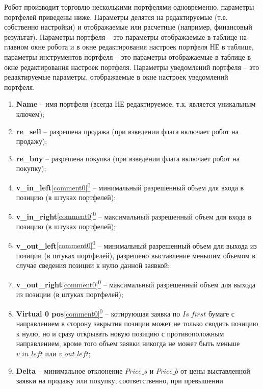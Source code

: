 Робот производит торговлю несколькими портфелями одновременно, параметры портфелей приведены ниже. Параметры делятся на редактируемые (т.е. собственно настройки) и
отображаемые или расчетные (например, финансовый результат). Параметры портфеля -- это параметры отображаемые в таблице на главном окне робота и в окне редактирования настроек
портфеля НЕ в таблице, параметры инструментов портфеля -- это параметры отображаемые в таблице в окне редактирования настроек портфеля. Параметры уведомлений портфеля -- это
редактируемые параметры, отображаемые в окне настроек уведомлений портфеля.


\begin{enumerate}
	\item \textbf{Name} -- имя портфеля (всегда НЕ редактируемое, т.к. является уникальным ключем);
	\item \textbf{re\_sell} -- разрешена продажа (при взведении флага включает робот на продажу);
	\item \textbf{re\_buy} -- разрешена покупка (при взведении флага включает робот на покупку);
	\item \textbf{v\_in\_left}\hyperref[comment0]{\ref{comment0}\textsuperscript{0}} -- минимальный разрешенный объем для входа в позицию (в штуках портфелей);
	\item \textbf{v\_in\_right}\hyperref[comment0]{\ref{comment0}\textsuperscript{0}} -- максимальный разрешенный объем для входа в позицию (в штуках портфелей);
	\item \textbf{v\_out\_left}\hyperref[comment0]{\ref{comment0}\textsuperscript{0}} -- минимальный разрешенный объем для выхода из позиции (в штуках портфелей), разрешено выставление меньшим объемом в случае сведения
		позиции к нулю данной заявкой;
	\item \textbf{v\_out\_right}\hyperref[comment0]{\ref{comment0}\textsuperscript{0}} -- максимальный разрешенный объем для выхода из позиции (в штуках портфелей);
	\item \textbf{Virtual 0 pos}\hyperref[comment0]{\ref{comment0}\textsuperscript{0}} -- котирующая заявка по $Is \; first$ бумаге с направлением в сторону закрытия позиции может не только сводить позицию к нулю,
		но и сразу открывать новую позицию с противоположным направлением, кроме того объем заявки никогда не может быть меньше $v\_in\_left$ или $v\_out\_left$;
	\item \textbf{Delta} -- минимальное отклонение $Price\_s$ и $Price\_b$ от цены выставленной заявки на продажу или покупку, соответственно, при превышении

\end{enumerate}
